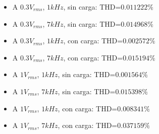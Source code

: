 \begin{itemize}
\item A $0.3V_{rms}$, $1kHz$, sin carga: THD=$0.011222\%$
\item A $0.3V_{rms}$, $7kHz$, sin carga: THD=$0.014968\%$
\item A $0.3V_{rms}$, $1kHz$, con carga: THD=$0.002572\%$
\item A $0.3V_{rms}$, $7kHz$, con carga: THD=$0.015194\%$
\item A $1V_{rms}$, $1kHz$, sin carga: THD=$0.001564\%$
\item A $1V_{rms}$, $7kHz$, sin carga: THD=$0.015398\%$
\item A $1V_{rms}$, $1kHz$, con carga: THD=$0.008341\%$
\item A $1V_{rms}$, $7kHz$, con carga: THD=$0.037159\%$
\end{itemize}